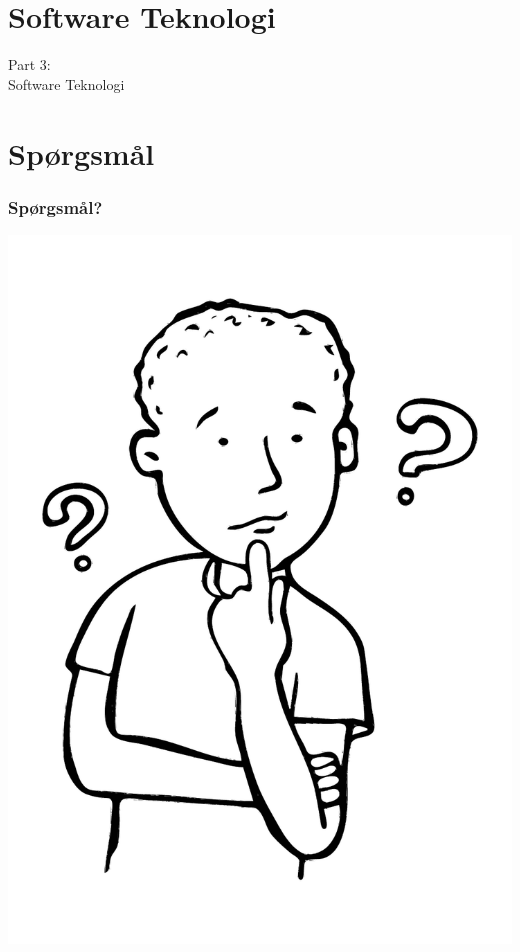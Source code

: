 \section{Software Teknologi}
\begin{frame}
    \vspace{25mm}
    \begin{center}
        \Huge{Part 3:\\Software Teknologi}
    \end{center}
\end{frame}

\section{Spørgsmål}
\begin{frame}
    \frametitle{\textbf{Spørgsmål?}}
    \vspace{-15mm}
    \begin{center}
        \includegraphics[scale=0.4]{./figs/Boy-asking-question.pdf}
    \end{center}
    \vspace{-25mm}
\end{frame}

